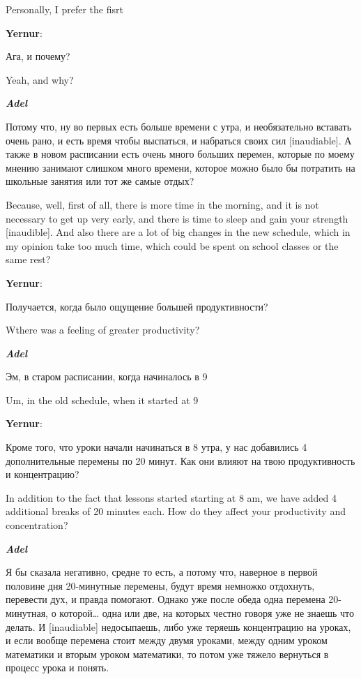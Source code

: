 Personally, I prefer the fisrt

\textbf{Yernur}: 

Ага, и почему?

Yeah, and why?

\textbf{\textit{Adel}}

Потому что, ну во первых есть больше времени с утра, и необязательно вставать очень рано, и есть время чтобы выспаться, и набраться своих сил [inaudiable]. А также в новом расписании есть очень много больших перемен, которые по моему мнению занимают слишком много времени, которое можно было бы потратить на школьные занятия или тот же самые отдых?

Because, well, first of all, there is more time in the morning, and it is not necessary to get up very early, and there is time to sleep and gain your strength [inaudible]. And also there are a lot of big changes in the new schedule, which in my opinion take too much time, which could be spent on school classes or the same rest?

\textbf{Yernur}:

Получается, когда было ощущение большей продуктивности?

Wthere was a feeling of greater productivity?

\textbf{\textit{Adel}}

Эм, в старом расписании, когда начиналось в 9

Um, in the old schedule, when it started at 9

\textbf{Yernur}: 

Кроме того, что уроки начали начинаться в 8 утра, у нас добавились 4 дополнительные перемены по 20 минут. Как они влияют на твою продуктивность и концентрацию?

In addition to the fact that lessons started starting at 8 am, we have added 4 additional breaks of 20 minutes each. How do they affect your productivity and concentration?

\textbf{\textit{Adel}}

Я бы сказала негативно, средне то есть, а потому что, наверное в первой половине дня 20-минутные перемены, будут время немножко отдохнуть, перевести дух, и правда помогают. Однако уже после обеда одна перемена 20-минутная, о которой… одна или две, на которых честно говоря уже не знаешь что делать. И [inaudiable] недосыпаешь, либо уже теряешь концентрацию на уроках, и если вообще перемена стоит между двумя уроками, между одним уроком математики и вторым уроком математики, то потом уже тяжело вернуться в процесс урока и понять.

